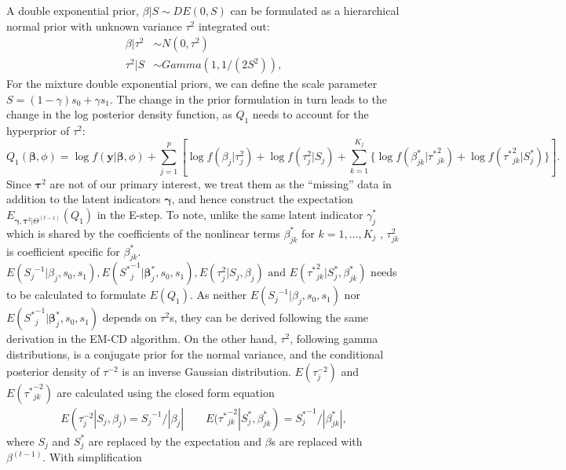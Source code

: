 \documentclass[
]{article}
\begin{document}
A double exponential prior, \(\beta|S \sim DE(0, S)\) can be formulated
as a hierarchical normal prior with unknown variance \(\tau^2\)
integrated out: \begin{align*}
  \beta|\tau^2 &\sim N(0, \tau^2)\\
  \tau^2|S & \sim Gamma(1, 1/(2S^2)), 
\end{align*} For the mixture double exponential priors, we can define
the scale parameter \(S = (1-\gamma)s_0 + \gamma s_1\). The change in
the prior formulation in turn leads to the change in the log posterior
density function, as \(Q_1\) needs to account for the hyperprior of
\(\tau^2\): \begin{equation}\label{eq:Q1_IWLS}
Q_1(\boldsymbol{\beta}, \phi) = \log f(\textbf{y}|\boldsymbol{\beta}, \phi) + \sum\limits_{j=1}^p\left[\log f(\beta_j|{\tau}^2_j) + \log f({\tau}^2_j| S_j)+\sum\limits_{k=1}^{K_j} \{\log f(\beta^{*}_{jk}|{\tau^{*}}^2_{jk})+\log f({\tau^*}^2_{jk}| S^*_j)\}\right].
\end{equation} Since \(\boldsymbol{\tau}^2\) are not of our primary
interest, we treat them as the ``missing'' data in addition to the
latent indicators \(\boldsymbol{\gamma}\), and hence construct the
expectation
\(E_{\boldsymbol{\gamma}, \boldsymbol{\tau}^2|\Theta^{(t-1)}}(Q_1)\) in
the E-step. To note, unlike the same latent indicator \(\gamma^*_j\)
which is shared by the coefficients of the nonlinear terms
\(\beta^*_{jk}\) for \(k = 1, \dots, K_j\) , \(\tau^2_{jk}\) is
coefficient specific for \(\beta^*_{jk}\).
\(E({S_j}^{-1}|\beta_j, s_0, s_1), E({S^*}^{-1}_j|\boldsymbol{\beta}_j^*, s_0, s_1), E({\tau}^2_{j}|S_j, \beta_j) \text{ and } E({\tau^*}^2_{jk}|S_j^*, \beta^*_{jk})\)
needs to be calculated to formulate \(E(Q_1)\). As neither
\(E({S_j}^{-1}|\beta_j, s_0, s_1)\) nor
\(E({S^*}^{-1}_j|\boldsymbol{\beta}_j^*, s_0, s_1)\) depends on
\(\tau^2\)s, they can be derived following the same derivation in the
EM-CD algorithm. On the other hand, \(\tau^{2}\), following gamma
distributions, is a conjugate prior for the normal variance, and the
conditional posterior density of \(\tau^{-2}\) is an inverse Gaussian
distribution. \(E({\tau}^{-2}_{j})\) and \(E({\tau^*}^{-2}_{jk})\) are
calculated using the closed form equation \begin{align*}
 E({\tau}^{-2}_{j}|S_j, \beta_j) ={S_j}^{-1}/|\beta_j| \qquad E({\tau^*}^{-2}_{jk}|S_j^*, \beta^*_{jk})={S_j^*}^{-1}/|\beta^*_{jk}|,
\end{align*} where \(S_j\) and \(S_j^*\) are replaced by the expectation
and \(\beta\)s are replaced with \(\beta^{(t-1)}\). With simplification
\end{document}
